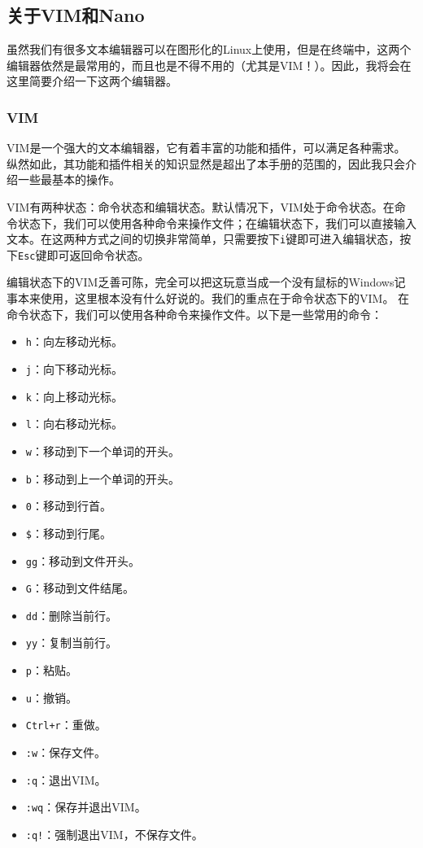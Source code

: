 \documentclass[../main.tex]{subfiles}
\begin{document}
\subsection{关于VIM和Nano}

虽然我们有很多文本编辑器可以在图形化的Linux上使用，但是在终端中，这两个编辑器依然是最常用的，而且也是不得不用的（尤其是VIM！）。因此，我将会在这里简要介绍一下这两个编辑器。

\subsubsection{VIM}

VIM是一个强大的文本编辑器，它有着丰富的功能和插件，可以满足各种需求。纵然如此，其功能和插件相关的知识显然是超出了本手册的范围的，因此我只会介绍一些最基本的操作。

VIM有两种状态：命令状态和编辑状态。默认情况下，VIM处于命令状态。在命令状态下，我们可以使用各种命令来操作文件；在编辑状态下，我们可以直接输入文本。在这两种方式之间的切换非常简单，只需要按下\texttt{i}键即可进入编辑状态，按下\texttt{Esc}键即可返回命令状态。

编辑状态下的VIM乏善可陈，完全可以把这玩意当成一个没有鼠标的Windows记事本来使用，这里根本没有什么好说的。我们的重点在于命令状态下的VIM。
在命令状态下，我们可以使用各种命令来操作文件。以下是一些常用的命令：

\begin{multicols}{2}
  \begin{itemize}
    \item \texttt{h}：向左移动光标。
    \item \texttt{j}：向下移动光标。
    \item \texttt{k}：向上移动光标。
    \item \texttt{l}：向右移动光标。
    \item \texttt{w}：移动到下一个单词的开头。
    \item \texttt{b}：移动到上一个单词的开头。
    \item \texttt{0}：移动到行首。
    \item \texttt{\$}：移动到行尾。
    \item \texttt{gg}：移动到文件开头。
    \item \texttt{G}：移动到文件结尾。
    \item \texttt{dd}：删除当前行。
    \item \texttt{yy}：复制当前行。
    \item \texttt{p}：粘贴。
    \item \texttt{u}：撤销。
    \item \texttt{Ctrl+r}：重做。
    \item \texttt{:w}：保存文件。
    \item \texttt{:q}：退出VIM。
    \item \texttt{:wq}：保存并退出VIM。
    \item \texttt{:q!}：强制退出VIM，不保存文件。
  \end{itemize}
\end{multicols}
\end{document}

